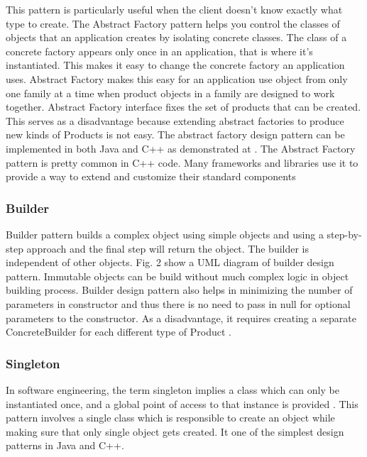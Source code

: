 \documentclass[sigplan,12pt,nonacm=true,review=false]{acmart}
\begin{document}
This pattern is particularly useful when the client doesn’t know exactly what type to create. The Abstract Factory pattern helps you control the classes of objects that an application creates by isolating concrete classes. The class of a concrete factory appears only once in an application, that is where it’s instantiated. This makes it easy to change the concrete factory an application uses. Abstract Factory makes this easy for an application use object from only one family at a time when product objects in a family are designed to work together. 
Abstract Factory interface fixes the set of products that can be created. This serves as a disadvantage because extending abstract factories to produce new kinds of Products is not easy. 
The abstract factory design pattern can be implemented in both Java and C++ as demonstrated at \cite{noauthor_abstract_2017, noauthor_abstract_nodate}. The Abstract Factory pattern is pretty common in C++ code. Many frameworks and libraries use it to provide a way to extend and customize their standard components



\subsubsection{Builder}
Builder pattern builds a complex object using simple objects and using a step-by-step approach and the final step will return the object. The builder is independent of other objects. Fig. 2 show a UML diagram of builder design pattern. Immutable objects can be build without much complex logic in object building process. Builder design pattern also helps in minimizing the number of parameters in constructor and thus there is no need to pass in null for optional parameters to the constructor. As a disadvantage, it requires creating a separate ConcreteBuilder for each different type of Product \cite{noauthor_design_nodate-4, noauthor_builder_2017}.

\subsubsection{Singleton}
In software engineering, the term singleton implies a class which can only be instantiated once, and a global point of access to that instance is provided \cite{noauthor_abstract_nodate-1}. This pattern involves a single class which is responsible to create an object while making sure that only single object gets created. It one of the simplest design patterns in Java and C++.
\end{document}
